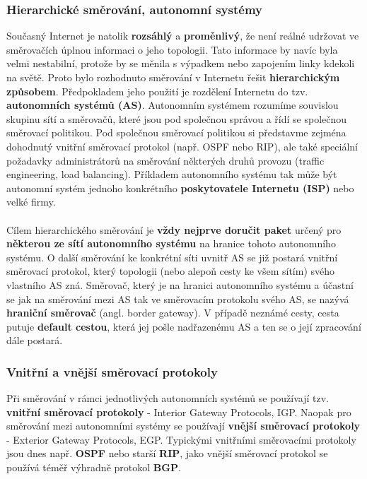 \subsubsection*{Hierarchické směrování, autonomní systémy}
Současný Internet je natolik \textbf{rozsáhlý} a \textbf{proměnlivý}, že není reálné udržovat ve směrovačích úplnou informaci o jeho topologii. Tato informace by navíc byla velmi nestabilní, protože by se měnila s výpadkem nebo zapojením linky kdekoli na světě. Proto bylo rozhodnuto směrování v Internetu řešit \textbf{hierarchickým způsobem}. Předpokladem jeho použití je rozdělení Internetu do tzv. \textbf{autonomních systémů (AS)}. Autonomním systémem rozumíme souvislou skupinu sítí a směrovačů, které jsou pod společnou správou a řídí se společnou směrovací politikou. Pod společnou směrovací politikou si představme zejména dohodnutý vnitřní směrovací protokol (např. OSPF nebo RIP), ale také speciální požadavky administrátorů na směrování některých druhů provozu (traffic engineering, load balancing). Příkladem autonomního systému tak může být autonomní systém jednoho konkrétního\textbf{ poskytovatele Internetu (ISP)} nebo velké firmy.
\\\\
Cílem hierarchického směrování je \textbf{vždy nejprve doručit paket} určený pro \textbf{některou ze sítí autonomního systému} na hranice tohoto autonomního systému. O další směrování ke konkrétní síti uvnitř AS se již postará vnitřní směrovací protokol, který topologii (nebo alepoň cesty ke všem sítím) svého vlastního AS zná. Směrovač, který je na hranici autonomního systému a účastní se jak na směrování mezi AS tak ve směrovacím protokolu svého AS, se nazývá \textbf{hraniční směrovač} (angl. border gateway). V případě neznámé cesty, cesta putuje \textbf{default cestou}, která jej pošle nadřazenému AS a ten se o její zpracování dále postará.

\subsubsection*{Vnitřní a vnější směrovací protokoly}
Při směrování v rámci jednotlivých autonomních systémů se používají tzv. \textbf{vnitřní směrovací protokoly} - Interior Gateway Protocols, IGP. Naopak pro směrování mezi autonomními systémy se používají \textbf{vnější směrovací protokoly} - Exterior Gateway Protocols, EGP. Typickými vnitřními směrovacími protokoly jsou dnes např. \textbf{OSPF} nebo starší \textbf{RIP}, jako vnější směrovací protokol se používá téměř výhradně protokol \textbf{BGP}.

